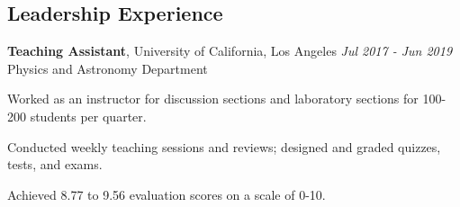\documentclass[margin,line]{./templates/resume}
\begin{document}
\begin{resume}
\section{\mysidestyle Leadership Experience}
\textbf{Teaching Assistant}, University of California, Los Angeles {\hfill \textsl{Jul 2017 - Jun 2019}}\\
Physics and Astronomy Department
\begin{list2}
    \item {Worked as an instructor for discussion sections and laboratory sections for 100-200 students per quarter.}
    \item {Conducted weekly teaching sessions and reviews; designed and graded quizzes, tests, and exams.}
    \item {Achieved 8.77 to 9.56 evaluation scores on a scale of 0-10.}
\end{list2}







\end{resume}
\end{document}
